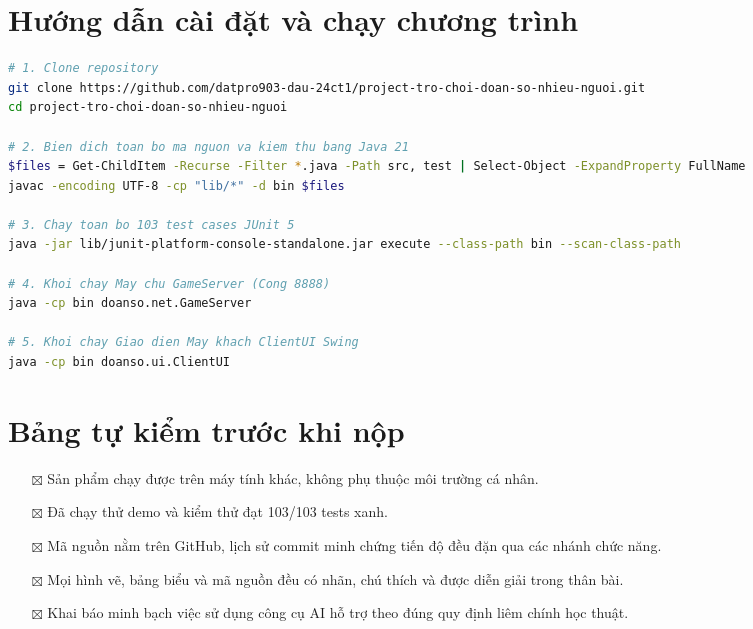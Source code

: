 \documentclass[12pt,a4paper,oneside]{report}
\begin{document}
\appendix
\chapter{Hướng dẫn cài đặt và chạy chương trình}
\begin{lstlisting}[language=bash, caption={Các bước biên dịch và chạy ứng dụng từ dòng lệnh}]
# 1. Clone repository
git clone https://github.com/datpro903-dau-24ct1/project-tro-choi-doan-so-nhieu-nguoi.git
cd project-tro-choi-doan-so-nhieu-nguoi

# 2. Bien dich toan bo ma nguon va kiem thu bang Java 21
$files = Get-ChildItem -Recurse -Filter *.java -Path src, test | Select-Object -ExpandProperty FullName
javac -encoding UTF-8 -cp "lib/*" -d bin $files

# 3. Chay toan bo 103 test cases JUnit 5
java -jar lib/junit-platform-console-standalone.jar execute --class-path bin --scan-class-path

# 4. Khoi chay May chu GameServer (Cong 8888)
java -cp bin doanso.net.GameServer

# 5. Khoi chay Giao dien May khach ClientUI Swing
java -cp bin doanso.ui.ClientUI
\end{lstlisting}

\chapter{Bảng tự kiểm trước khi nộp}
\begin{itemize}
  \item[$\boxtimes$] Sản phẩm chạy được trên máy tính khác, không phụ thuộc môi trường cá nhân.
  \item[$\boxtimes$] Đã chạy thử demo và kiểm thử đạt 103/103 tests xanh.
  \item[$\boxtimes$] Mã nguồn nằm trên GitHub, lịch sử commit minh chứng tiến độ đều đặn qua các nhánh chức năng.
  \item[$\boxtimes$] Mọi hình vẽ, bảng biểu và mã nguồn đều có nhãn, chú thích và được diễn giải trong thân bài.
  \item[$\boxtimes$] Khai báo minh bạch việc sử dụng công cụ AI hỗ trợ theo đúng quy định liêm chính học thuật.
\end{itemize}
\end{document}
